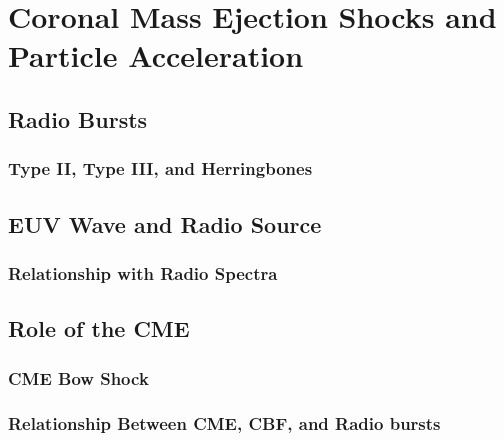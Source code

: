 

\chapter{Coronal Mass Ejection Shocks and Particle Acceleration} 
\label{chap:5}


\section{Radio Bursts}\label{sec:1}

\subsection{Type II, Type III, and Herringbones}\label{sec:10}


\section{EUV Wave and Radio Source}\label{sec:2}

\subsection{Relationship with Radio Spectra}\label{sec:20}


\section{Role of the CME}\label{sec:3}

\subsection{CME Bow Shock}\label{sec:30}

\subsection{Relationship Between CME, CBF, and Radio bursts}\label{sec:31}


